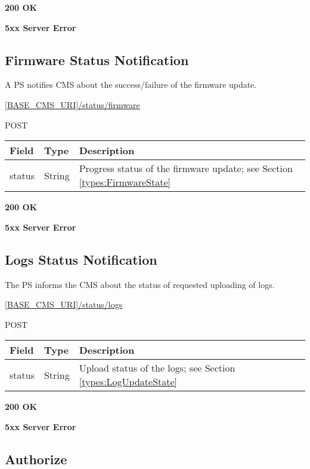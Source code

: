  \textbf{200 OK}

 \textbf{5xx Server Error}

\subsection{Firmware Status Notification}

A \acs{PS} notifies \acs{CMS} about the success/failure of the firmware update. 

 \url{[BASE_CMS_URI]/status/firmware}

 POST

\begin{tabularx}{\linewidth}{ | l | l | X | }
  \hline
  \rowcolor{table-head}
  Field & Type & Description \\
  \hline
  	status & String			& Progress status of the firmware update; see Section \ref{types:FirmwareState} \\	
  \hline
\end{tabularx}

 \textbf{200 OK}

 \textbf{5xx Server Error}

\subsection{Logs Status Notification}

The \acs{PS} informs the \acs{CMS} about the status of requested uploading of logs.

 \url{[BASE_CMS_URI]/status/logs}

 POST

\begin{tabularx}{\linewidth}{ | l | l | X | }
  \hline
  \rowcolor{table-head}
  Field & Type & Description \\
  \hline
  	status & String			& Upload status of the logs; see Section \ref{types:LogUpdateState} \\	
  \hline
\end{tabularx}

 \textbf{200 OK}

 \textbf{5xx Server Error}

\subsection{Authorize}

